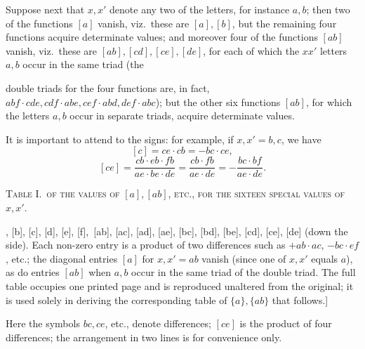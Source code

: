 \documentclass[11pt,a4paper]{article}
\begin{document}
\medskip

Suppose next that $x, x'$ denote any two of the letters, for instance $a, b$; then two of the functions $[a]$ vanish, viz.\ these are $[a], [b]$, but the remaining four functions acquire determinate values; and moreover four of the functions $[ab]$ vanish, viz.\ these are $[ab], [cd], [ce], [de]$, for each of which the $xx'$ letters $a, b$ occur in the same triad (the

\newpage


\noindent double triads for the four functions are, in fact, $abf \cdot cde, cdf \cdot abe, cef \cdot abd, def \cdot abc$); but the other six functions $[ab]$, for which the letters $a, b$ occur in separate triads, acquire determinate values.

\medskip

It is important to attend to the signs: for example, if $x, x' = b, c$, we have
\[
[c] = ce \cdot cb = -bc \cdot ce,
\]
\[
[ce] = \frac{cb \cdot eb \cdot fb}{ae \cdot be \cdot de} = \frac{cb \cdot fb}{ae \cdot de} = -\frac{bc \cdot bf}{ae \cdot de}.
\]

\bigskip

\begin{center}
\textsc{Table I.\ of the values of $[a], [ab]$, etc., for the sixteen special values of $x, x'$.}
\end{center}

\medskip

\noindent [The original printed table is a large $16 \times 16$ array giving, for each of the sixteen special pairs $x, x' = \infty\infty, ab, ac, ad, ae, af, bc, bd, be, bf, cd, ce, cf, de, df, ef$ (across the top), the corresponding values (with proper signs) of the sixteen functions
\[
[a], [b], [c], [d], [e], [f],\ [ab], [ac], [ad], [ae], [bc], [bd], [be], [cd], [ce], [de]
\]
(down the side). Each non-zero entry is a product of two differences such as $+ab \cdot ac$, $-bc \cdot ef$, etc.; the diagonal entries $[a]$ for $x, x' = ab$ vanish (since one of $x, x'$ equals $a$), as do entries $[ab]$ when $a, b$ occur in the same triad of the double triad. The full table occupies one printed page and is reproduced unaltered from the original; it is used solely in deriving the corresponding table of $\{a\}, \{ab\}$ that follows.]

\newpage


\noindent Here the symbols $bc, ce$, etc., denote differences; $[ce]$ is the product of four differences; the arrangement in two lines is for convenience only.
\end{document}
